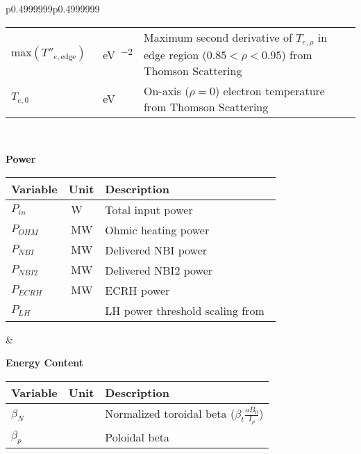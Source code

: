\begin{table*}[h]
\begin{tabular}{p{}p{}}
{\begin{minipage}{1\textwidth}
\begin{tabular}{p{}p{}p{}}
$\text{max}(T''_{e,\text{edge}})$ & \SI{}{\electronvolt\per\rho\squared} & Maximum second derivative of $T_{e,\rho}$ in edge region ($0.85 < \rho < 0.95$) from Thomson Scattering \\
$T_{e,0}$ & \SI{}{\electronvolt} & On-axis ($\rho=0$) electron temperature from Thomson Scattering \\
\bottomrule
\end{tabular}
\end{minipage}} \\
\begin{minipage}{0.4999999\textwidth}
\vspace{1.55em}\begin{center}\textbf{Power}\end{center}\vspace{-1.2em}
\flushleft
\begin{tabular}{p{}p{}p{}}
\toprule
Variable & Unit & Description \\
\midrule
$P_{\textit{in}}$ & $\SI{}{\watt}$ & Total input power \\
$P_{\textit{OHM}}$ & $\SI{}{\mega\watt}$ & Ohmic heating power \\
$P_{\textit{NBI}}$ & $\SI{}{\mega\watt}$ & Delivered NBI power \\
$P_{\textit{NBI2}}$ & $\SI{}{\mega\watt}$ & Delivered NBI2 power \\
$P_{\textit{ECRH}}$ & $\SI{}{\mega\watt}$ & ECRH power\\
$P_{\textit{LH}}$ & \hphantom{.} & LH power threshold scaling from~\cite{hmodeiter2008}\vspace{0.3em} \\
\bottomrule
\end{tabular}
\end{minipage}  & 
\begin{minipage}{0.4999999\textwidth}
\vspace{1.35em}\begin{center}\textbf{Energy Content}\end{center}\vspace{-1.2em}
\flushright
\begin{tabular}{p{}p{}p{}}
\toprule
Variable & Unit & Description \\
\midrule
$\beta_{N}$ & \hphantom{.} & Normalized toroidal beta ($\beta_{t}\frac{aB_0}{I_p}$)\\
$\beta_{p}$ & \hphantom{.} & Poloidal beta \\

\end{tabular}
\end{minipage}
\end{tabular}
\end{table*}
